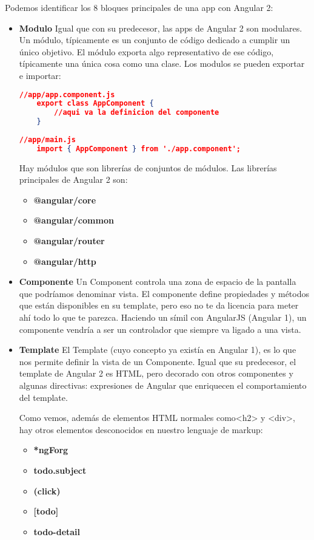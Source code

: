 Podemos identificar los 8 bloques principales de una app con Angular 2:
\begin{itemize}

\item \textbf{Modulo} Igual que con su predecesor, las apps de Angular 2 son modulares. Un módulo, típicamente es un conjunto de código dedicado a cumplir un único objetivo. El módulo exporta algo representativo de ese código, típicamente una única cosa como una clase. Los modulos se pueden exportar e importar:

 \begin{lstlisting}[language=JSON] 
//app/app.component.js
    export class AppComponent {
        //aqui va la definicion del componente
    }
 
//app/main.js
    import { AppComponent } from './app.component';
\end{lstlisting}
   
Hay módulos que son librerías de conjuntos de módulos. Las librerías principales de Angular 2 son:
\begin{itemize}
\item \textbf{@angular/core}
\item \textbf{@angular/common}
\item \textbf{@angular/router}
\item \textbf{@angular/http}
\end{itemize}

\item \textbf{Componente} Un Component controla una zona de espacio de la pantalla que podríamos denominar vista. El componente define propiedades y métodos que están disponibles en su template, pero eso no te da licencia para meter ahí todo lo que te parezca. Haciendo un símil con AngularJS (Angular 1), un componente vendría a ser un controlador que siempre va ligado a una vista.
\item \textbf{Template} El Template (cuyo concepto ya existía en Angular 1), es lo que nos permite definir la vista de un Componente.
Igual que su predecesor, el template de Angular 2 es HTML, pero decorado con otros componentes y algunas directivas: expresiones de Angular que enriquecen el comportamiento del template.

Como vemos, además de elementos HTML normales como<h2> y <div>, hay otros elementos desconocidos en nuestro lenguaje de markup:
\begin{itemize}
\item \textbf{*ngForg}
\item \textbf{todo.subject}
\item \textbf{(click)}
\item \textbf{[todo]}
\item \textbf{todo-detail}
\end{itemize}


\end{itemize}
